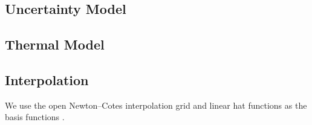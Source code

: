 \subsection{Uncertainty Model}


\subsection{Thermal Model}


\subsection{Interpolation}
We use the open Newton--Cotes interpolation grid and linear hat functions as the
basis functions \cite{klimke2006}.
